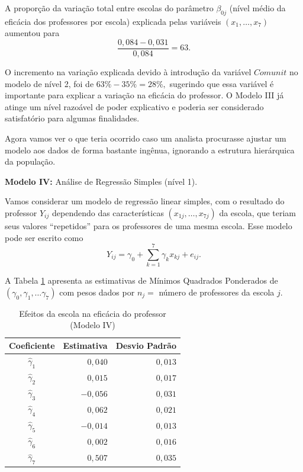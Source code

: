 \documentclass[]{book}
\numberwithin{example}{chapter}
\numberwithin{remark}{chapter}
\numberwithin{definition}{chapter}
\begin{document}
A proporção da variação total entre escolas do parâmetro \(\beta _{0j}\)
(nível médio da eficácia dos professores por escola) explicada pelas
variáveis \(\left( x_{1},\ldots ,x_{7}\right)\) aumentou para \[
\frac{0,084-0,031}{0,084}=63.
\]

O incremento na variação explicada devido à introdução da variável
\(Comunit\) no modelo de nível 2, foi de \(63\%-35\%=28\%,\) sugerindo
que essa variável é importante para explicar a variação na eficácia do
professor. O Modelo III já atinge um nível razoável de poder explicativo
e poderia ser considerado satisfatório para algumas finalidades.

Agora vamos ver o que teria ocorrido caso um analista procurasse ajustar
um modelo aos dados de forma bastante ingênua, ignorando a estrutura
hierárquica da população.

\textbf{Modelo IV:} Análise de Regressão Simples (nível 1).

Vamos considerar um modelo de regressão linear simples, com o resultado
do professor \(Y_{ij}\) dependendo das características
\(\left(x_{1j},\ldots ,x_{7j}\right)\) da escola, que teriam seus
valores ``repetidos'' para os professores de uma mesma escola. Esse
modelo pode ser escrito como \[
Y_{ij}=\gamma _{0}+\sum\limits_{k=1}^{7}\gamma _{k}x_{kj}+e_{ij}.
\]

A Tabela \ref{tab97} apresenta as estimativas de Mínimos Quadrados
Ponderados de
\(\left( \gamma _{0},\gamma _{1},\ldots \gamma _{7}\right)\) com pesos
dados por \(n_{j}=\) número de professores da escola \(j\).

\begin{center}
\begin{table}[tbp] \centering%
\caption{Efeitos da escola na eficácia do professor (Modelo IV)}\bigskip
\label{tab97}
\begin{tabular}{|c|c|c|}
\hline\hline
Coeficiente & Estimativa & Desvio Padrão \\ \hline\hline
$\hat{\gamma}_{1}$ & \multicolumn{1}{|r|}{$0,040$} & \multicolumn{1}{|r|}{$%
0,013$} \\
$\hat{\gamma}_{2}$ & \multicolumn{1}{|r|}{$0,015$} & \multicolumn{1}{|r|}{$%
0,017$} \\
$\hat{\gamma}_{3}$ & \multicolumn{1}{|r|}{$-0,056$} & \multicolumn{1}{|r|}{$%
0,031$} \\
$\hat{\gamma}_{4}$ & \multicolumn{1}{|r|}{$0,062$} & \multicolumn{1}{|r|}{$%
0,021$} \\
$\hat{\gamma}_{5}$ & \multicolumn{1}{|r|}{$-0,014$} & \multicolumn{1}{|r|}{$%
0,013$} \\
$\hat{\gamma}_{6}$ & \multicolumn{1}{|r|}{$0,002$} & \multicolumn{1}{|r|}{$%
0,016$} \\
$\hat{\gamma}_{7}$ & \multicolumn{1}{|r|}{$0,507$} & \multicolumn{1}{|r|}{$%
0,035$} \\ \hline\hline
\end{tabular}
\end{table}%
\end{center}
\end{document}
